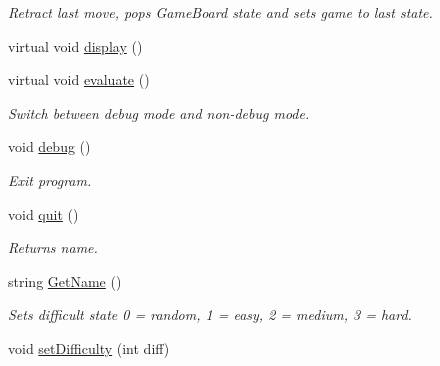 \begin{DoxyCompactItemize}
\begin{DoxyCompactList}\small\item\em Retract last move, pops Game\-Board state and sets game to last state. \end{DoxyCompactList}\item 
virtual void \hyperlink{class_game_a4d0223a84926cbabea95ed7e0392690a}{display} ()
\item 
\hypertarget{class_game_a9fb895bd0ce0684a2cf95d3d212487df}{virtual void \hyperlink{class_game_a9fb895bd0ce0684a2cf95d3d212487df}{evaluate} ()}\label{class_game_a9fb895bd0ce0684a2cf95d3d212487df}

\begin{DoxyCompactList}\small\item\em Switch between debug mode and non-\/debug mode. \end{DoxyCompactList}\item 
\hypertarget{class_game_a29997a321e10a5456f0aef9e95c51757}{void \hyperlink{class_game_a29997a321e10a5456f0aef9e95c51757}{debug} ()}\label{class_game_a29997a321e10a5456f0aef9e95c51757}

\begin{DoxyCompactList}\small\item\em Exit program. \end{DoxyCompactList}\item 
\hypertarget{class_game_a8272be134d16c277bb014ad6a22fc357}{void \hyperlink{class_game_a8272be134d16c277bb014ad6a22fc357}{quit} ()}\label{class_game_a8272be134d16c277bb014ad6a22fc357}

\begin{DoxyCompactList}\small\item\em Returns name. \end{DoxyCompactList}\item 
\hypertarget{class_game_ab81299d944d2779d482067640e576389}{string \hyperlink{class_game_ab81299d944d2779d482067640e576389}{Get\-Name} ()}\label{class_game_ab81299d944d2779d482067640e576389}

\begin{DoxyCompactList}\small\item\em Sets difficult state 0 = random, 1 = easy, 2 = medium, 3 = hard. \end{DoxyCompactList}\item 
\hypertarget{class_game_ae8ac0005c039f0f5f2dd1c10a299fe8d}{void \hyperlink{class_game_ae8ac0005c039f0f5f2dd1c10a299fe8d}{set\-Difficulty} (int diff)}\label{class_game_ae8ac0005c039f0f5f2dd1c10a299fe8d}


\end{DoxyCompactItemize}
